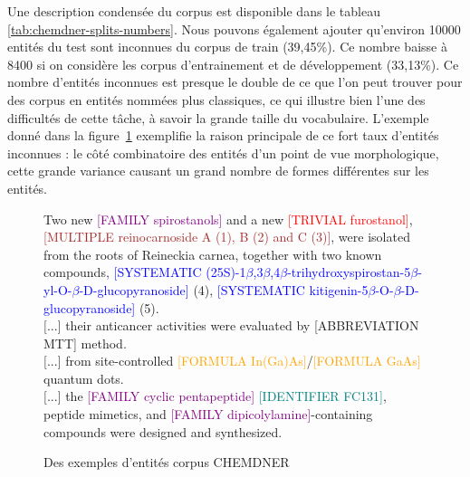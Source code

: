 \documentclass[PhD-Yoann-Dupont.tex]{subfiles}
\begin{document}
Une description condensée du corpus est disponible dans le tableau \ref{tab:chemdner-splits-numbers}. Nous pouvons également ajouter qu'environ 10000 entités du test sont inconnues du corpus de train (39,45\%). Ce nombre baisse à 8400 si on considère les corpus d'entrainement et de développement (33,13\%). Ce nombre d'entités inconnues est presque le double de ce que l'on peut trouver pour des corpus en entités nommées plus classiques, ce qui illustre bien l'une des difficultés de cette tâche, à savoir la grande taille du vocabulaire. L'exemple donné dans la figure\ \ref{fig:CHEMDNER-examples} exemplifie la raison principale de ce fort taux d'entités inconnues : le côté combinatoire des entités d'un point de vue morphologique, cette grande variance causant un grand nombre de formes différentes sur les entités.

\begin{figure}[ht!]
\begin{helvetica}
\small
Two new \textcolor{purple}{[FAMILY spirostanols]} and a new \textcolor{red}{[TRIVIAL furostanol]}, \textcolor{brown}{[MULTIPLE reinocarnoside A (1), B (2) and C (3)]}, were isolated from the roots of Reineckia carnea, together with two known compounds, \textcolor{blue}{[SYSTEMATIC (25S)-1$\beta$,3$\beta$,4$\beta$-trihydroxyspirostan-5$\beta$-yl-O-$\beta$-D-glucopyranoside]} (4), \textcolor{blue}{[SYSTEMATIC kitigenin-5$\beta$-O-$\beta$-D-glucopyranoside]} (5). \\
$[$...$]$ their anticancer activities were evaluated by \textcolor{green!50!black}{[ABBREVIATION MTT]} method. \\
$[$...$]$ from site-controlled \textcolor{orange}{[FORMULA In(Ga)As]}/\textcolor{orange}{[FORMULA GaAs]} quantum dots. \\
$[$...$]$ the \textcolor{purple}{[FAMILY cyclic pentapeptide]} \textcolor{teal}{[IDENTIFIER FC131]}, peptide mimetics, and \textcolor{purple}{[FAMILY dipicolylamine]}-containing compounds were designed and synthesized.
\end{helvetica}
\caption{Des exemples d'entités corpus CHEMDNER}
\label{fig:CHEMDNER-examples}
\end{figure}
\end{document}
